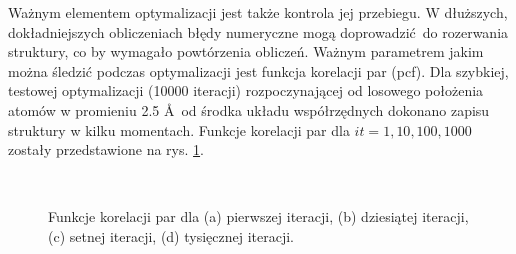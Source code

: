 \documentclass[a4paper,12pt]{article}
\begin{document}
	Ważnym elementem optymalizacji jest także kontrola jej przebiegu.
	W dłuższych, dokładniejszych obliczeniach błędy numeryczne mogą doprowadzić do rozerwania struktury, co by wymagało powtórzenia obliczeń.
	Ważnym parametrem jakim można śledzić podczas optymalizacji jest funkcja korelacji par (pcf).
	Dla szybkiej, testowej optymalizacji (10000 iteracji) rozpoczynającej od losowego położenia atomów w promieniu 2.5 \AA $\,$ od środka układu współrzędnych dokonano zapisu struktury w kilku momentach.
	Funkcje korelacji par dla $it = 1,10,100,1000$ zostały przedstawione na rys. \ref{optim_pcf}.
	\begin{figure}[h]
		\begin{subfigure}{0.49\textwidth}
			\centering
			
			\caption{}
		\end{subfigure}
		\begin{subfigure}{0.49\textwidth}
			\centering
			
			\caption{}
		\end{subfigure}
		\\
		\begin{subfigure}{0.49\textwidth}
			\centering
			
			\caption{}
		\end{subfigure}
		\begin{subfigure}{0.49\textwidth}
			\centering
			
			\caption{}
		\end{subfigure}
		\caption{Funkcje korelacji par dla (a) pierwszej iteracji, (b) dziesiątej iteracji, (c) setnej iteracji, (d) tysięcznej iteracji.}
		\label{optim_pcf}
	\end{figure}
	
\end{document}
